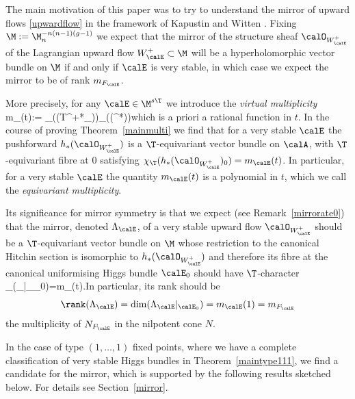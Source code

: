The main motivation of this paper was to try to understand the mirror of upward flows  \eqref{upwardflow} in the framework of Kapustin and Witten \cite{kapustin-witten}. Fixing $\M:=\M_{n}^{-n(n-1)(g-1)}$ we expect that the mirror of the structure sheaf $\calO_{W^+_\calE}$ of the  Lagrangian upward flow ${W^+_\calE}\subset \M$ will be a hyperholomorphic vector bundle %
on $\M$ if and only if $\calE$ is very stable, in which case we expect the mirror to be of rank   $m_{F_\calE}$.

More precisely,  for any $\calE\in \M^{s\T}$ we introduce the {\em virtual multiplicity}
\beq\label{virmul}m_\calE(t):={ \chi_\T(\Sym(T^{+*}_\calE))\over \chi_\T(\Sym(\calA^*))}\eeq which is a priori  a rational function in $t$. In the course of proving Theorem~\ref{mainmulti} we find that for a very stable $\calE$ the pushforward $h_*(\calO_{W^+_\calE})$ is a $\T$-equivariant vector bundle on $\calA$, with  $\T$-equivariant fibre at $0$ satisfying $\chi_\T(h_*(\calO_{W^+_\calE})_0)=m_\calE(t)$. In particular, for a very stable $\calE$ the quantity $m_\calE(t)$ is a polynomial in $t$, which we call the {\em  equivariant multiplicity}.

Its significance for mirror symmetry is that we expect (see Remark~\ref{mirrorate0}) that  the mirror, denoted $\Lambda_\calE$, of a very stable upward flow $\calO_{W^+_\calE}$ should be a $\T$-equivariant vector bundle on $\M$ whose restriction to the canonical Hitchin section is isomorphic to $h_*(\calO_{W^+_\calE})$ and therefore its fibre at the canonical uniformising Higgs bundle $\calE_0$ should have $\T$-character \beq \label{mirrorexp}\chi_\T(\Lambda_\calE|_{\calE_0})=m_\calE(t).\eeq In particular, its rank should be $$\rank(\Lambda_\calE)=\dim(\Lambda_\calE|_{\calE_0})=m_\calE(1)=m_{F_\calE}$$ the multiplicity of $N_{F_\calE}$ in the nilpotent cone $N$.

In the case of type $(1,\dots,1)$ fixed points, where we have a complete classification of very stable Higgs bundles in Theorem~\ref{maintype111}, we  find a candidate for the mirror, which is supported by the following results sketched below. For details see Section~\ref{mirror}.

